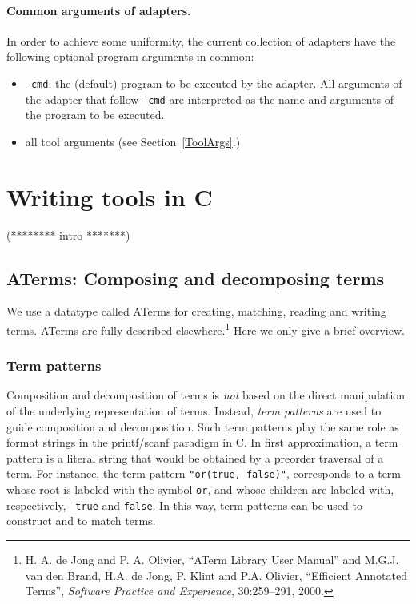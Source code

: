 \documentclass[a4,twoside,noweb]{article} %
\begin{document}
\paragraph{Common arguments of adapters.} In order to achieve some uniformity,
the current collection of adapters have the following optional program arguments
in common:

\begin{itemize}

\item {\tt -cmd}: the (default) program to be executed by the adapter.
All arguments of the adapter that follow {\tt -cmd} are interpreted as
the name and arguments of the program to be executed.

\item all tool arguments (see Section~\ref{ToolArgs}.)
\end{itemize}


\section{\label{ToolsInC}Writing tools in C}

(******** intro *******)

\subsection{\label{Compose}ATerms: Composing and decomposing terms}

We use a datatype called ATerms for creating, matching, reading and
writing terms. ATerms are fully described elsewhere.\footnote{H. A. de
Jong and P. A. Olivier, ``ATerm Library User Manual'' and M.G.J. van
den Brand, H.A. de Jong, P. Klint and P.A. Olivier, ``Efficient
Annotated Terms'', \emph{Software Practice and Experience},
30:259--291, 2000.}  Here we only give a brief overview.


\subsubsection{\label{Patterns}Term patterns}
Composition and decomposition of terms is {\em not} based on the
direct manipulation of the underlying representation of terms.
Instead, {\em term patterns} are used to guide composition and
decomposition.  Such term patterns play the same role as format
strings in the printf/scanf paradigm in C.  In first approximation, a
term pattern is a literal string that would be obtained by a preorder
traversal of a term.  For instance, the term pattern {\tt "or(true,
false)"}, corresponds to a term whose root is labeled with the symbol
{\tt or}, and whose children are labeled with, respectively, {\tt
true} and {\tt false}. In this way, term patterns can be used to
construct and to match terms.
\end{document}
